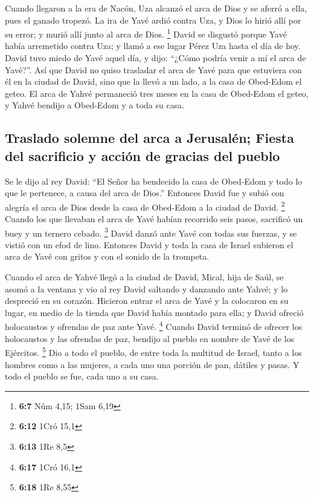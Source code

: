 \begin{paracol}{2}
 Cuando llegaron a la era de Nacón, Uza alcanzó el arca de
Dios y se aferró a ella, pues el ganado tropezó.  La ira
de Yavé ardió contra Uza, y Dios lo hirió allí por su error; y murió
allí junto al arca de Dios. \footnote{\textbf{6:7} Núm 4,15; 1Sam 6,19}
 David se disgustó porque Yavé había arremetido contra
Uza; y llamó a ese lugar Pérez Uza hasta el día de hoy. 
David tuvo miedo de Yavé aquel día, y dijo: ``¿Cómo podría venir a mí el
arca de Yavé?''.  Así que David no quiso trasladar el
arca de Yavé para que estuviera con él en la ciudad de David, sino que
la llevó a un lado, a la casa de Obed-Edom el geteo.  El
arca de Yahvé permaneció tres meses en la casa de Obed-Edom el geteo, y
Yahvé bendijo a Obed-Edom y a toda su casa.

\hypertarget{traslado-solemne-del-arca-a-jerusaluxe9n-fiesta-del-sacrificio-y-acciuxf3n-de-gracias-del-pueblo}{%
\subsection{Traslado solemne del arca a Jerusalén; Fiesta del sacrificio
y acción de gracias del
pueblo}\label{traslado-solemne-del-arca-a-jerusaluxe9n-fiesta-del-sacrificio-y-acciuxf3n-de-gracias-del-pueblo}}

 Se le dijo al rey David: ``El Señor ha bendecido la casa
de Obed-Edom y todo lo que le pertenece, a causa del arca de Dios.''
Entonces David fue y subió con alegría el arca de Dios desde la casa de
Obed-Edom a la ciudad de David. \footnote{\textbf{6:12} 1Cró 15,1}
 Cuando los que llevaban el arca de Yavé habían recorrido
seis pasos, sacrificó un buey y un ternero cebado. \footnote{\textbf{6:13}
  1Re 8,5}  David danzó ante Yavé con todas sus fuerzas,
y se vistió con un efod de lino.  Entonces David y toda
la casa de Israel subieron el arca de Yavé con gritos y con el sonido de
la trompeta.

 Cuando el arca de Yahvé llegó a la ciudad de David,
Mical, hija de Saúl, se asomó a la ventana y vio al rey David saltando y
danzando ante Yahvé; y lo despreció en su corazón. 
Hicieron entrar el arca de Yavé y la colocaron en su lugar, en medio de
la tienda que David había montado para ella; y David ofreció holocaustos
y ofrendas de paz ante Yavé. \footnote{\textbf{6:17} 1Cró 16,1}
 Cuando David terminó de ofrecer los holocaustos y las
ofrendas de paz, bendijo al pueblo en nombre de Yavé de los Ejércitos.
\footnote{\textbf{6:18} 1Re 8,55}  Dio a todo el pueblo,
de entre toda la multitud de Israel, tanto a los hombres como a las
mujeres, a cada uno una porción de pan, dátiles y pasas. Y todo el
pueblo se fue, cada uno a su casa.


\end{paracol}
